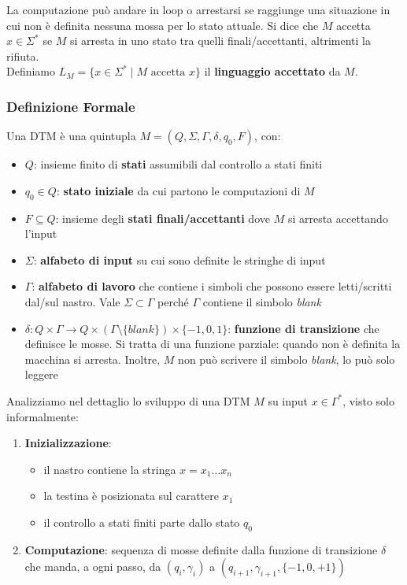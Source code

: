 La computazione può andare in loop o arrestarsi se raggiunge una situazione in cui non è definita nessuna mossa per lo stato attuale. Si dice che $M$ accetta $x \in \Sigma^\ast$ se $M$ si arresta in uno stato tra quelli finali/accettanti, altrimenti la rifiuta.\\

Definiamo $L_M = \{x \in \Sigma^\ast \mid M \text{ accetta } x \}$ il \textbf{linguaggio accettato} da $M$.\\

\subsubsection{Definizione Formale}
Una DTM è una quintupla $M = \left(Q, \Sigma, \Gamma, \delta, q_0, F\right)$, con:
\begin{itemize}
	\item $Q$: insieme finito di \textbf{stati} assumibili dal controllo a stati finiti
	\item $q_0 \in Q$: \textbf{stato iniziale} da cui partono le computazioni di $M$
	\item $F \subseteq Q$: insieme degli \textbf{stati finali/accettanti} dove $M$ si arresta accettando l'input
	\item $\Sigma$: \textbf{alfabeto di input} su cui sono definite le stringhe di input
	\item $\Gamma$: \textbf{alfabeto di lavoro} che contiene i simboli che possono essere letti/scritti dal/sul nastro. Vale $\Sigma \subset \Gamma$ perché $\Gamma$ contiene il simbolo \textit{blank}
	\item $\delta: Q \times \Gamma \rightarrow Q \times (\Gamma \setminus \{blank\}) \times \{-1, 0, 1\}$: \textbf{funzione di transizione} che definisce le mosse. Si tratta di una funzione parziale: quando non è definita la macchina si arresta. Inoltre, $M$ non può scrivere il simbolo \textit{blank}, lo può solo leggere
\end{itemize}

Analizziamo nel dettaglio lo sviluppo di una DTM $M$ su input $x \in \Gamma^\ast$, visto solo informalmente: 
\begin{enumerate}
	\item \textbf{Inizializzazione}: 
	\begin{itemize}
		\item il nastro contiene la stringa $x = x_1 \dots x_n$
		\item la testina è posizionata sul carattere $x_1$
		\item il controllo a stati finiti parte dallo stato $q_0$
	\end{itemize}
	\item \textbf{Computazione}: sequenza di mosse definite dalla funzione di transizione $\delta$ che manda, a ogni passo, da $(q_i, \gamma_i)$ a $(q_{i+1}, \gamma_{i+1}, \{-1, 0, +1\})$
\end{enumerate}


